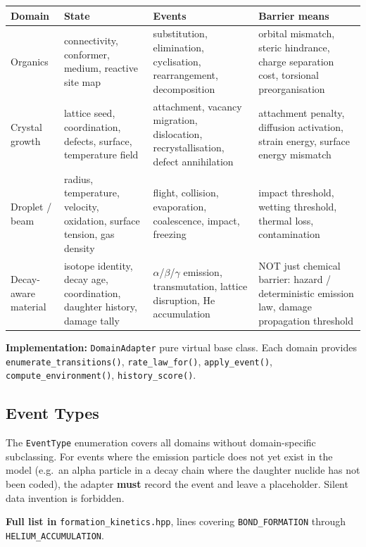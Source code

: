 \documentclass[11pt]{article}
\begin{document}
\begin{center}
\begin{tabular}{lp{4cm}p{4cm}p{4cm}}
\toprule
Domain & State & Events & Barrier means \\
\midrule
Organics &
  connectivity, conformer, medium, reactive site map &
  substitution, elimination, cyclisation, rearrangement, decomposition &
  orbital mismatch, steric hindrance, charge separation cost, torsional preorganisation \\[6pt]
Crystal growth &
  lattice seed, coordination, defects, surface, temperature field &
  attachment, vacancy migration, dislocation, recrystallisation, defect annihilation &
  attachment penalty, diffusion activation, strain energy, surface energy mismatch \\[6pt]
Droplet / beam &
  radius, temperature, velocity, oxidation, surface tension, gas density &
  flight, collision, evaporation, coalescence, impact, freezing &
  impact threshold, wetting threshold, thermal loss, contamination \\[6pt]
Decay-aware material &
  isotope identity, decay age, coordination, daughter history, damage tally &
  $\alpha$/$\beta$/$\gamma$ emission, transmutation, lattice disruption, He accumulation &
  NOT just chemical barrier: hazard / deterministic emission law, damage propagation threshold \\
\bottomrule
\end{tabular}
\end{center}

\textbf{Implementation:} \texttt{DomainAdapter} pure virtual base class.
Each domain provides \texttt{enumerate\_transitions()},
\texttt{rate\_law\_for()}, \texttt{apply\_event()},
\texttt{compute\_environment()}, \texttt{history\_score()}.

\subsection{Event Types}

The \texttt{EventType} enumeration covers all domains without domain-specific
subclassing.  For events where the emission particle does not yet exist in the
model (e.g.\ an alpha particle in a decay chain where the daughter nuclide has
not been coded), the adapter \textbf{must} record the event and leave a
placeholder.  Silent data invention is forbidden.

\textbf{Full list in} \texttt{formation\_kinetics.hpp}, lines covering
\texttt{BOND\_FORMATION} through \texttt{HELIUM\_ACCUMULATION}.
\end{document}
